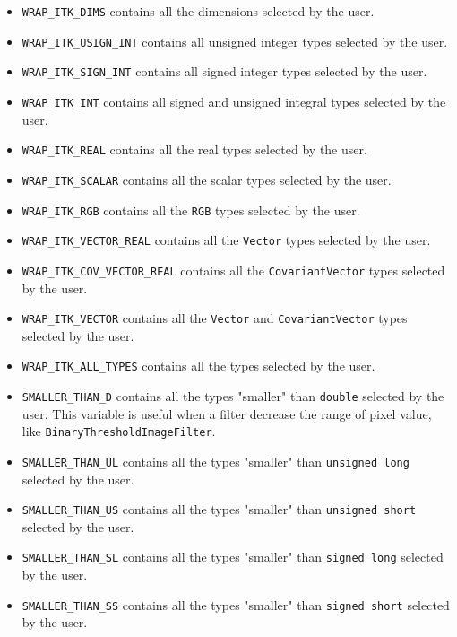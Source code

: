 \documentclass{InsightArticle}
\begin{document}
\begin{itemize}
  \item \verb$WRAP_ITK_DIMS$ contains all the dimensions selected by the user.

  \item \verb$WRAP_ITK_USIGN_INT$ contains all unsigned integer types selected by the user.

  \item \verb$WRAP_ITK_SIGN_INT$ contains all signed integer types selected by the user.

  \item \verb$WRAP_ITK_INT$ contains all signed and unsigned integral types
selected by the user.

  \item \verb$WRAP_ITK_REAL$ contains all the real types selected by the user.

  \item \verb$WRAP_ITK_SCALAR$ contains all the scalar types selected by the user.

  \item \verb$WRAP_ITK_RGB$ contains all the \verb$RGB$ types selected by the user.

  \item \verb$WRAP_ITK_VECTOR_REAL$ contains all the \verb$Vector$ types selected
by the user.

  \item \verb$WRAP_ITK_COV_VECTOR_REAL$ contains all the \verb$CovariantVector$ types selected
by the user.

  \item \verb$WRAP_ITK_VECTOR$ contains all the \verb$Vector$ and 
\verb$CovariantVector$ types selected by the user.

  \item \verb$WRAP_ITK_ALL_TYPES$ contains all the types selected by the user.

  \item \verb$SMALLER_THAN_D$ contains all the types "smaller" than \verb$double$
selected by the user. This variable is useful when a filter decrease the range
of pixel value, like \verb$BinaryThresholdImageFilter$.

  \item \verb$SMALLER_THAN_UL$ contains all the types "smaller" than \verb$unsigned long$
selected by the user.

  \item \verb$SMALLER_THAN_US$ contains all the types "smaller" than \verb$unsigned short$
selected by the user.

  \item \verb$SMALLER_THAN_SL$ contains all the types "smaller" than \verb$signed long$
selected by the user.

  \item \verb$SMALLER_THAN_SS$ contains all the types "smaller" than \verb$signed short$
selected by the user.

\end{itemize}
\end{document}
